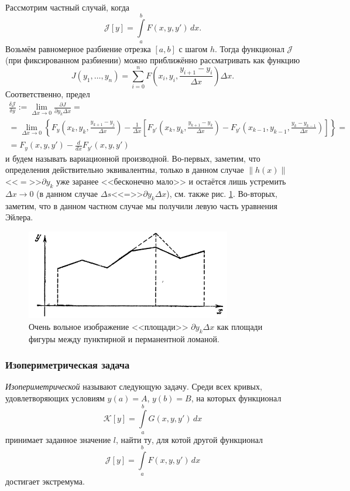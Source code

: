 Рассмотрим частный случай, когда  
\[
  \mathscr J[y] = \int\limits_{a}^{b}F(x, y, y')\,dx.
\]
Возьмём равномерное разбиение отрезка $ [a,b] $ с шагом $ h $. Тогда функционал
$ \mathscr J $
(при фиксированном разбиении) можно приближённо рассматривать как функцию  
\[
  J(y_1, \ldots, y_n) = \sum_{i=0}^n F\left(x_i, y_i, \frac{y_{i+1} -
  y_i}{\Delta x}\right) \Delta x.
\]
Соответственно, предел
\begin{multline*}
  \frac{\delta \mathscr J}{\delta y} := \lim_{\Delta x \to 0} \frac{\partial
  J}{\partial y_k \Delta x} = \\
  = \lim_{\Delta x \to 0} \left\{  F_y \left( x_k, y_k,
  \frac{y_{k+1} - y_j}{\Delta x} \right) - \frac{1}{\Delta x} \left[ F_{y'}
\left( x_k, y_k, \frac{y_{k+1} - y_k}{\Delta x} \right) - F_{y'} \left( x_{k-1},
y_{k-1}, \frac{y_k - y_{k-1}}{\Delta x}\right)  \right]\right\} = \\
= F_y(x, y, y') - \frac{d}{dx}F_{y'}(x, y, y')
\end{multline*}
и будем называть вариационной производной. Во-первых, заметим, что определения
действительно эквивалентны, только в данном случае $ \|h(x)\| $<<$=$>>$ \partial y_k $ уже заранее
<<бесконечно мало>> и остаётся лишь устремить $ \Delta x \to 0 $ (в данном
случае $ \Delta s $<<=>>$ \partial y_k \Delta x $), см. также рис. \ref{fig:lom}. Во-вторых, заметим, что в данном частном случае мы
получили левую часть уравнения Эйлера.
\begin{figure}[H]
  \centering
  \includegraphics[width=0.8\textwidth]{img/lom.png}
  \caption{Очень вольное изображение <<площади>> $ \partial y_k\Delta x $ как
  площади фигуры между пунктирной и перманентной ломаной.}
  \label{fig:lom}
\end{figure}

\subsubsection{Изопериметрическая задача}
\begin{definition}
  \emph{Изопериметрической} называют следующую задачу. Среди всех кривых,
  удовлетворяющих условиям $ y(a) = A $, $ y(b) = B $, на которых функционал 
  \[
  \mathscr K[y] = \int\limits_{a}^{b}G(x, y, y')\,dx
  \]
принимает заданное значение $ l $, найти ту, для котой другой функционал  
\[
  \mathscr J[y] = \int\limits_{a}^{b}F(x, y, y')\,dx
\]
достигает экстремума.
\end{definition}

